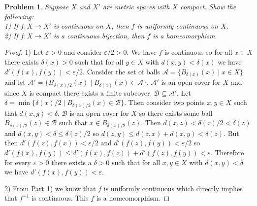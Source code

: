 \documentclass{article}
\newtheorem{problem}{Problem}
\begin{document}
\begin{flushleft}
\begin{problem}
Suppose $X$ and $X'$ are metric spaces with $X$ compact. Show the following:\\
1) If $f : X \rightarrow X'$ is continuous on $X$, then $f$ is uniformly continuous on $X$.\\
2) If $f : X \rightarrow X'$ is a continuous bijection, then $f$ is a homeomorphism.
\end{problem}
\begin{proof}
1) Let $\varepsilon > 0$ and consider $\varepsilon/2 > 0$. We have $f$ is continuous so for all $x \in X$ there exists $\delta (x) > 0$ such that for all $y \in X$ with $d(x,y) < \delta (x)$ we have $d'(f(x),f(y)) < \varepsilon/2$. Consider the set of balls $\mathcal{A} = \{B_{\delta(x)}(x) \mid x\in X\}$ and let $\mathcal{A}' = \{B_{\delta(x)/2}(x) \mid B_{\delta(x)}(x) \in \mathcal{A}\}$. $\mathcal{A}'$ is an open cover for $X$ and since $X$ is compact there exists a finite subcover, $\mathcal{B} \subseteq \mathcal{A}'$. Let $\delta = \min \{\delta(x)/2 \mid B_{\delta(x)/2}(x) \in \mathcal{B} \}$. Then consider two points $x,y \in X$ such that $d(x,y) < \delta$. $\mathcal{B}$ is an open cover for $X$ so there exists some ball $B_{\delta(z)/2}(z) \in \mathcal{B}$ such that $x \in B_{\delta(x)/2}(z)$. Then $d(x,z) < \delta(z)/2 < \delta(z)$ and $d(x,y) < \delta \leq \delta(z)/2$ so $d(z,y) \leq d(z,x) + d(x,y) < \delta(z)$. But then $d'(f(z),f(x)) < \varepsilon/2$ and $d'(f(z),f(y)) < \varepsilon/2$ so $d'(f(x),f(y)) \leq d'(f(x),f(z)) + d'(f(z),f(y)) < \varepsilon$. Therefore for every $\varepsilon > 0$ there exists a $\delta > 0$ such that for all $x,y \in X$ with $d(x,y) < \delta$ we have $d'(f(x),f(y)) < \varepsilon$.\newline

2) From Part 1) we know that $f$ is uniformly continuous which directly implies that $f^{-1}$ is continuous. This $f$ is a homeomorphism.
\end{proof}

\end{flushleft}
\end{document}

